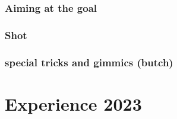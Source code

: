 \documentclass{scrartcl}
\begin{document}
 \subsubsection{Aiming at the goal}
 
 \subsubsection{Shot}

 \subsubsection{special tricks and gimmics (butch)}

 
 \section{Experience 2023}
 
\end{document}
